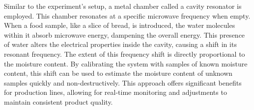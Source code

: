 \documentclass[10pt]{article}
\begin{document}
Similar to the experiment's setup, a metal chamber called a cavity resonator is employed. This chamber resonates at a specific microwave frequency when empty. When a food sample, like a slice of bread, is introduced, the water molecules within it absorb microwave energy, dampening the overall energy. This presence of water alters the electrical properties inside the cavity, causing a shift in its resonant frequency. The extent of this frequency shift is directly proportional to the moisture content. By calibrating the system with samples of known moisture content, this shift can be used to estimate the moisture content of unknown samples quickly and non-destructively. This approach offers significant benefits for production lines, allowing for real-time monitoring and adjustments to maintain consistent product quality.

\printbibliography
\end{document}
